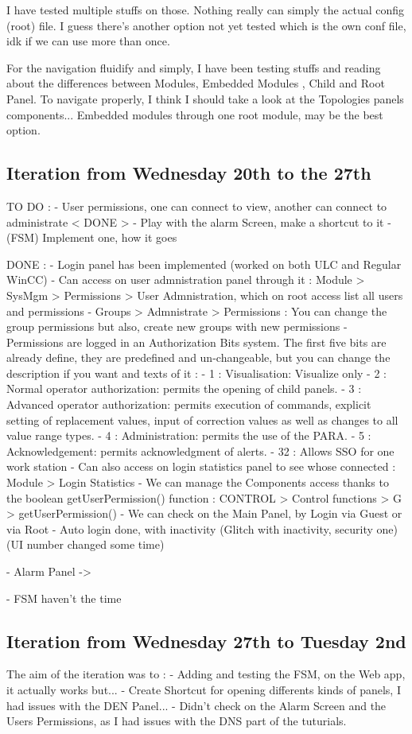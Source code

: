 \documentclass[a4paper, 10pt]{article}
\begin{document}
I have tested multiple stuffs on those. Nothing really can simply the actual config (root) file.
I guess there's another option not yet tested which is the own conf file, idk if we can use more than once.

For the navigation fluidify and simply, I have been testing stuffs and reading about the differences between Modules, Embedded Modules , Child and Root Panel.
To navigate properly, I think I should take a look at the Topologies panels components...
Embedded modules through one root module, may be the best option.

\subsection*{Iteration from Wednesday 20th to the 27th}
TO DO : - User permissions, one can connect to view, another can connect to administrate < DONE >
        - Play with the alarm Screen, make a shortcut to it
        - (FSM) Implement one, how it goes

DONE :  - Login panel has been implemented (worked on both ULC and Regular WinCC)
        - Can access on user admnistration panel through it : Module > SysMgm > Permissions > User Admnistration, which on root access list all users and permissions
        - Groups > Admnistrate > Permissions : You can change the group permissions but also, create new groups with new permissions
        - Permissions are logged in an Authorization Bits system. The first five bits are already define, they are predefined and un-changeable, but you can change the description if you want and texts of it : 
            - 1 : Visualisation: Visualize only
            - 2 : Normal operator authorization: permits the opening of child panels.
            - 3 : Advanced operator authorization: permits execution of commands, explicit setting of replacement values, input of correction values as well as changes to all value range types.
            - 4 : Administration: permits the use of the PARA.
            - 5 : Acknowledgement: permits acknowledgment of alerts.
            - 32 : Allows SSO for one work station
        - Can also access on login statistics panel to see whose connected : Module > Login Statistics
        - We can manage the Components access thanks to the boolean getUserPermission() function : CONTROL > Control functions > G > getUserPermission()
        - We can check on the Main Panel, by Login via Guest or via Root
        - Auto login done, with inactivity (Glitch with inactivity, security one) (UI number changed some time)

        - Alarm Panel -> 

        - FSM haven't the time

\subsection*{Iteration from Wednesday 27th to Tuesday 2nd}
The aim of the iteration was to :
    - Adding and testing the FSM, on the Web app, it actually works but...
    - Create Shortcut for opening differents kinds of panels, I had issues with the DEN Panel...
    - Didn't check on the Alarm Screen and the Users Permissions, as I had issues with the DNS part of the tuturials.

\normalsize
\end{document}
